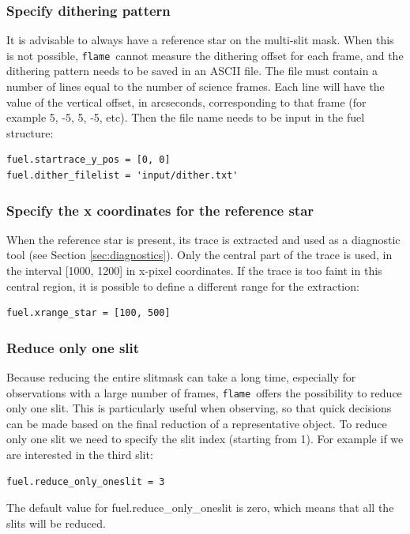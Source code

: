 \documentclass[a4paper, notitlepage]{article}
\newcommand{\flame}{\texttt{flame}}
\begin{document}
\subsubsection{Specify dithering pattern}

It is advisable to always have a reference star on the multi-slit mask. When this is not possible, \flame\ cannot measure the dithering offset for each frame, and the dithering pattern needs to be saved in an ASCII file. The file must contain a number of lines equal to the number of science frames. Each line will have the value of the vertical offset, in arcseconds, corresponding to that frame (for example 5, -5, 5, -5, etc). Then the file name needs to be input in the fuel structure:
\begin{lstlisting}
fuel.startrace_y_pos = [0, 0]
fuel.dither_filelist = 'input/dither.txt'
\end{lstlisting}


\subsubsection{Specify the x coordinates for the reference star}

When the reference star is present, its trace is extracted and used as a diagnostic tool (see Section \ref{sec:diagnostics}). Only the central part of the trace is used, in the interval [1000, 1200] in x-pixel coordinates. If the trace is too faint in this central region, it is possible to define a different range for the extraction:
\begin{lstlisting}
fuel.xrange_star = [100, 500]
\end{lstlisting}



\subsubsection{Reduce only one slit}

Because reducing the entire slitmask can take a long time, especially for observations with a large number of frames, \flame\ offers the possibility to reduce only one slit. This is particularly useful when observing, so that quick decisions can be made based on the final reduction of a representative object. To reduce only one slit we need to specify the slit index (starting from 1). For example if we are interested in the third slit:
\begin{lstlisting}
fuel.reduce_only_oneslit = 3
\end{lstlisting}
The default value for fuel.reduce\_only\_oneslit is zero, which means that all the slits will be reduced.
\end{document}
